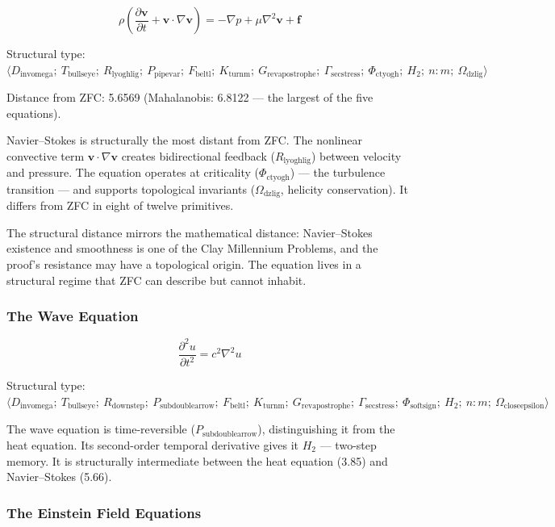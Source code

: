 \documentclass[12pt,a4paper]{article}
\begin{document}
\[\rho\left(\frac{\partial\mathbf{v}}{\partial t} + \mathbf{v}\cdot\nabla\mathbf{v}\right) = -\nabla p + \mu\nabla^2\mathbf{v} + \mathbf{f}\]

Structural type: $\langle D_{\text{invomega}};\ T_{\text{bullseye}};\ R_{\text{lyoghlig}};\ P_{\text{pipevar}};\ F_{\text{beltl}};\ K_{\text{turnm}};\ G_{\text{revapostrophe}};\ \Gamma_{\text{secstress}};\ \Phi_{\text{ctyogh}};\ H_2;\ n{:}m;\ \Omega_{\text{dzlig}} \rangle$

Distance from ZFC: 5.6569 (Mahalanobis: 6.8122 --- the largest of the five equations).

Navier--Stokes is structurally the most distant from ZFC. The nonlinear convective term $\mathbf{v}\cdot\nabla\mathbf{v}$ creates bidirectional feedback ($R_{\text{lyoghlig}}$) between velocity and pressure. The equation operates at criticality ($\Phi_{\text{ctyogh}}$) --- the turbulence transition --- and supports topological invariants ($\Omega_{\text{dzlig}}$, helicity conservation). It differs from ZFC in eight of twelve primitives.

The structural distance mirrors the mathematical distance: Navier--Stokes existence and smoothness is one of the Clay Millennium Problems, and the proof's resistance may have a topological origin. The equation lives in a structural regime that ZFC can describe but cannot inhabit.

\subsubsection{The Wave Equation}

\[\frac{\partial^2 u}{\partial t^2} = c^2\nabla^2 u\]

Structural type: $\langle D_{\text{invomega}};\ T_{\text{bullseye}};\ R_{\text{downstep}};\ P_{\text{subdoublearrow}};\ F_{\text{beltl}};\ K_{\text{turnm}};\ G_{\text{revapostrophe}};\ \Gamma_{\text{secstress}};\ \Phi_{\text{softsign}};\ H_2;\ n{:}m;\ \Omega_{\text{closeepsilon}} \rangle$

The wave equation is time-reversible ($P_{\text{subdoublearrow}}$), distinguishing it from the heat equation. Its second-order temporal derivative gives it $H_2$ --- two-step memory. It is structurally intermediate between the heat equation (3.85) and Navier--Stokes (5.66).

\subsubsection{The Einstein Field Equations}
\end{document}
